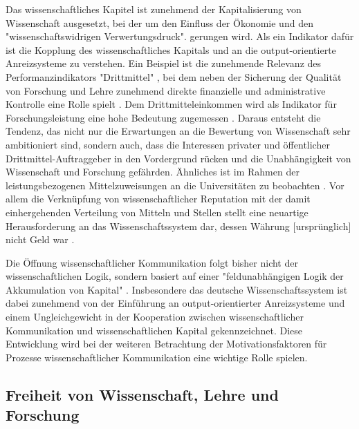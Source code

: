 \begin{enumerate}
\begin{end}
Das wissenschaftliches Kapitel ist zunehmend der Kapitalisierung von Wissenschaft ausgesetzt, bei der um den Einfluss der Ökonomie und den "wissenschaftswidrigen Verwertungsdruck". \cite{suchen_Hornbostel_2006} gerungen wird. Als ein Indikator dafür ist die Kopplung des wissenschaftliches Kapitals und an die output-orientierte Anreizsysteme zu verstehen. Ein Beispiel ist die zunehmende Relevanz des Performanzindikators "Drittmittel" \cite{Fabrizio_2008} \cite{Jansen_2007}, bei dem neben der Sicherung der Qualität von Forschung und Lehre zunehmend direkte finanzielle und administrative Kontrolle eine Rolle spielt \cite{Barl_sius_2008}. Dem Drittmitteleinkommen wird als Indikator für Forschungsleistung eine hohe Bedeutung zugemessen \cite{Jansen_2007}. Daraus entsteht die Tendenz, das nicht nur die Erwartungen an die Bewertung von Wissenschaft sehr ambitioniert sind, sondern auch, dass die Interessen privater und öffentlicher Drittmittel-Auftraggeber in den Vordergrund rücken und die Unabhängigkeit von Wissenschaft und Forschung gefährden. Ähnliches ist im Rahmen der leistungsbezogenen Mittelzuweisungen an die Universitäten zu beobachten \cite{suchen_Hornbostel_2006}. Vor allem die Verknüpfung von wissenschaftlicher Reputation mit der damit einhergehenden Verteilung von Mitteln und Stellen stellt eine neuartige Herausforderung an das Wissenschaftssystem dar, dessen Währung [ursprünglich] nicht Geld war \cite{hanekop_2006} \cite{suchen_Hornbostel_2006}.

Die Öffnung wissenschaftlicher Kommunikation folgt bisher nicht der wissenschaftlichen Logik, sondern basiert auf einer "feldunabhängigen Logik der Akkumulation von Kapital" \cite{herb_2006}. Insbesondere das deutsche Wissenschaftssystem ist dabei zunehmend von der Einführung an output-orientierter Anreizsysteme \cite{osterloh2008anreize} und einem Ungleichgewicht in der Kooperation zwischen wissenschaftlicher Kommunikation und wissenschaftlichen Kapital gekennzeichnet. Diese Entwicklung wird bei der weiteren Betrachtung der Motivationsfaktoren für Prozesse wissenschaftlicher Kommunikation eine wichtige Rolle spielen.

\subsection{Freiheit von Wissenschaft, Lehre und Forschung}


\end{end}
\end{enumerate}
